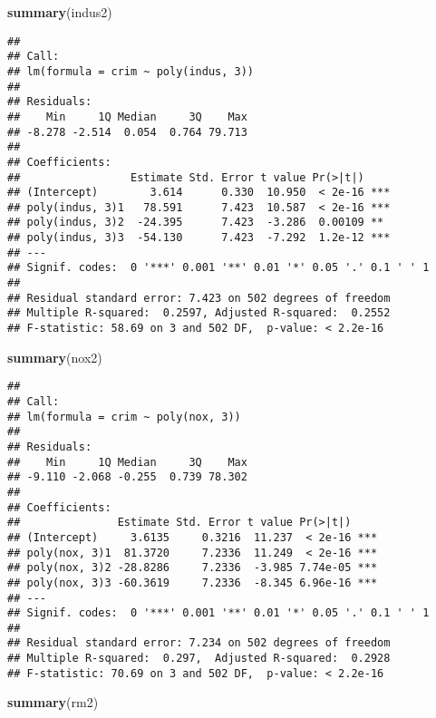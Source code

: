 \documentclass[]{article}
\newenvironment{Shaded}{\begin{snugshade}}{\end{snugshade}}
\newcommand{\KeywordTok}[1]{\textcolor[rgb]{0.13,0.29,0.53}{\textbf{#1}}}
\newcommand{\NormalTok}[1]{#1}
\begin{document}
\begin{Shaded}
\begin{Highlighting}[]
\KeywordTok{summary}\NormalTok{(indus2)}
\end{Highlighting}
\end{Shaded}

\begin{verbatim}
## 
## Call:
## lm(formula = crim ~ poly(indus, 3))
## 
## Residuals:
##    Min     1Q Median     3Q    Max 
## -8.278 -2.514  0.054  0.764 79.713 
## 
## Coefficients:
##                 Estimate Std. Error t value Pr(>|t|)    
## (Intercept)        3.614      0.330  10.950  < 2e-16 ***
## poly(indus, 3)1   78.591      7.423  10.587  < 2e-16 ***
## poly(indus, 3)2  -24.395      7.423  -3.286  0.00109 ** 
## poly(indus, 3)3  -54.130      7.423  -7.292  1.2e-12 ***
## ---
## Signif. codes:  0 '***' 0.001 '**' 0.01 '*' 0.05 '.' 0.1 ' ' 1
## 
## Residual standard error: 7.423 on 502 degrees of freedom
## Multiple R-squared:  0.2597, Adjusted R-squared:  0.2552 
## F-statistic: 58.69 on 3 and 502 DF,  p-value: < 2.2e-16
\end{verbatim}

\begin{Shaded}
\begin{Highlighting}[]
\KeywordTok{summary}\NormalTok{(nox2)}
\end{Highlighting}
\end{Shaded}

\begin{verbatim}
## 
## Call:
## lm(formula = crim ~ poly(nox, 3))
## 
## Residuals:
##    Min     1Q Median     3Q    Max 
## -9.110 -2.068 -0.255  0.739 78.302 
## 
## Coefficients:
##               Estimate Std. Error t value Pr(>|t|)    
## (Intercept)     3.6135     0.3216  11.237  < 2e-16 ***
## poly(nox, 3)1  81.3720     7.2336  11.249  < 2e-16 ***
## poly(nox, 3)2 -28.8286     7.2336  -3.985 7.74e-05 ***
## poly(nox, 3)3 -60.3619     7.2336  -8.345 6.96e-16 ***
## ---
## Signif. codes:  0 '***' 0.001 '**' 0.01 '*' 0.05 '.' 0.1 ' ' 1
## 
## Residual standard error: 7.234 on 502 degrees of freedom
## Multiple R-squared:  0.297,  Adjusted R-squared:  0.2928 
## F-statistic: 70.69 on 3 and 502 DF,  p-value: < 2.2e-16
\end{verbatim}

\begin{Shaded}
\begin{Highlighting}[]
\KeywordTok{summary}\NormalTok{(rm2)}
\end{Highlighting}
\end{Shaded}
\end{document}
